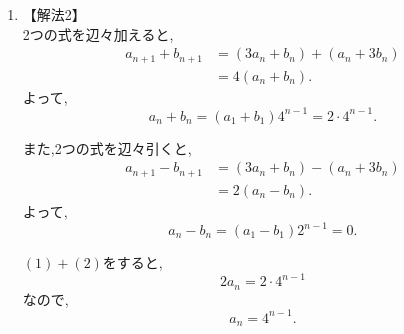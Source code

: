 \documentclass[dvipdfmx,a4paper,11pt,fleqn,openany]{jsbook}
\begin{document}
\begin{enumerate}[label=(\arabic*),parsep=3pt]
\begin{enumerate}
                    2式を辺々加えると,
                    \[
                      2a_n=2\cdot4^{n-1}
                    \]
                    であるから,
                    \[
                      a_n=4^{n-1}.
                    \]
                    また,
                    \[
                      b_n=a_n=4^{n-1}.
                    \]
              \item 【解法2】\\
                    2つの式を辺々加えると,
                    \begin{align*}
                      a_{n+1}+b_{n+1}
                        &=(3a_n+b_n)+(a_n+3b_n)\\
                        &=4(a_n+b_n).
                    \end{align*}
                    よって,
                    \[
                      a_n+b_n=(a_1+b_1)4^{n-1}=2\cdot4^{n-1}. \tag{1}
                    \]

                    また,2つの式を辺々引くと,
                    \begin{align*}
                      a_{n+1}-b_{n+1}
                        &=(3a_n+b_n)-(a_n+3b_n)\\
                        &=2(a_n-b_n).
                    \end{align*}
                    よって,
                    \[
                      a_n-b_n=(a_1-b_1)2^{n-1}=0. \tag{2}
                    \]

                    \((1)+(2)\)をすると,
                    \[
                      2a_n=2\cdot4^{n-1}
                    \]
                    なので,
                    \[
                      a_n=4^{n-1}.
                    \]


\end{enumerate}
\end{enumerate}
\end{document}
